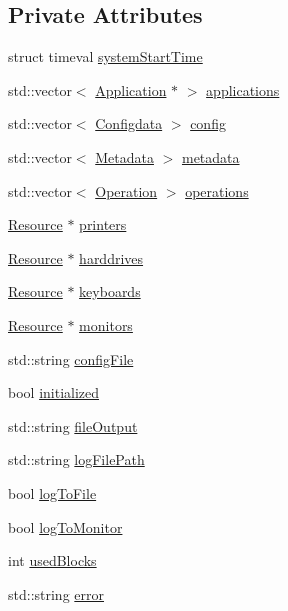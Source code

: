 \subsection*{Private Attributes}
\begin{DoxyCompactItemize}
\item 
struct timeval \hyperlink{class_simulator_a7ea88bc5971154f70055f76ecef021c9}{system\+Start\+Time}
\item 
std\+::vector$<$ \hyperlink{class_application}{Application} $\ast$ $>$ \hyperlink{class_simulator_adcc7cd2ee35795c8fa75a4e8c596b8bc}{applications}
\item 
std\+::vector$<$ \hyperlink{struct_configdata}{Configdata} $>$ \hyperlink{class_simulator_a0652336abca9dfc9a4e7abfa898fd639}{config}
\item 
std\+::vector$<$ \hyperlink{struct_metadata}{Metadata} $>$ \hyperlink{class_simulator_a4280898fdb4f5e2fe78eba77b7030bbc}{metadata}
\item 
std\+::vector$<$ \hyperlink{struct_operation}{Operation} $>$ \hyperlink{class_simulator_af0de92f112f7c366965c9c2ab3252e71}{operations}
\item 
\hyperlink{class_resource}{Resource} $\ast$ \hyperlink{class_simulator_a12e757d91db13aba3ab215b38c62f786}{printers}
\item 
\hyperlink{class_resource}{Resource} $\ast$ \hyperlink{class_simulator_ad9769c8acac3f878df047f28456d0082}{harddrives}
\item 
\hyperlink{class_resource}{Resource} $\ast$ \hyperlink{class_simulator_a947713e8c1b2cca9cf7700cad78dadf7}{keyboards}
\item 
\hyperlink{class_resource}{Resource} $\ast$ \hyperlink{class_simulator_adc7b9cba44f12566307e77741b6b15db}{monitors}
\item 
std\+::string \hyperlink{class_simulator_a7ef7a1e509bc344a6da592b979a7a09d}{config\+File}
\item 
bool \hyperlink{class_simulator_a5019732b443ef422efaf1b4e846a2768}{initialized}
\item 
std\+::string \hyperlink{class_simulator_ae1327302343c01ea0e127bd3486a7780}{file\+Output}
\item 
std\+::string \hyperlink{class_simulator_a8eeeadc65c37bf60d76832e501502259}{log\+File\+Path}
\item 
bool \hyperlink{class_simulator_a895e164e17a22b56e31a30ddf12f3067}{log\+To\+File}
\item 
bool \hyperlink{class_simulator_a7ae7d7fc57479dad16e8aab5397da7ce}{log\+To\+Monitor}
\item 
int \hyperlink{class_simulator_ad08c7310760168dd2014336ae3790ee3}{used\+Blocks}
\item 
std\+::string \hyperlink{class_simulator_ac5b8100ebe53ef360a973a4fb4891019}{error}
\end{DoxyCompactItemize}
